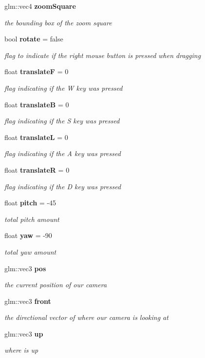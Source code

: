 \begin{DoxyCompactItemize}
glm\+::vec4 \textbf{ zoom\+Square}
\begin{DoxyCompactList}\small\item\em the bounding box of the zoom square \end{DoxyCompactList}\item 
bool \textbf{ rotate} = false
\begin{DoxyCompactList}\small\item\em flag to indicate if the right mouse button is pressed when dragging \end{DoxyCompactList}\item 
float \textbf{ translateF} = 0
\begin{DoxyCompactList}\small\item\em flag indicating if the W key was pressed \end{DoxyCompactList}\item 
float \textbf{ translateB} = 0
\begin{DoxyCompactList}\small\item\em flag indicating if the S key was pressed \end{DoxyCompactList}\item 
float \textbf{ translateL} = 0
\begin{DoxyCompactList}\small\item\em flag indicating if the A key was pressed \end{DoxyCompactList}\item 
float \textbf{ translateR} = 0
\begin{DoxyCompactList}\small\item\em flag indicating if the D key was pressed \end{DoxyCompactList}\item 
float \textbf{ pitch} = -\/45
\begin{DoxyCompactList}\small\item\em total pitch amount \end{DoxyCompactList}\item 
float \textbf{ yaw} = -\/90
\begin{DoxyCompactList}\small\item\em total yaw amount \end{DoxyCompactList}\item 
glm\+::vec3 \textbf{ pos}
\begin{DoxyCompactList}\small\item\em the current position of our camera \end{DoxyCompactList}\item 
glm\+::vec3 \textbf{ front}
\begin{DoxyCompactList}\small\item\em the directional vector of where our camera is looking at \end{DoxyCompactList}\item 
glm\+::vec3 \textbf{ up}
\begin{DoxyCompactList}\small\item\em where is up \end{DoxyCompactList}\end{DoxyCompactItemize}


